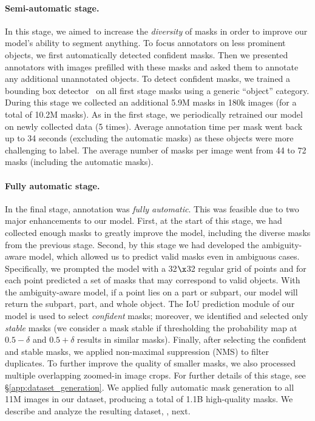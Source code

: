 \paragraph{Semi-automatic stage.} In this stage, we aimed to increase the \emph{diversity} of masks in order to improve our model's ability to segment anything. To focus annotators on less prominent objects, we first automatically detected confident masks. Then we presented annotators with images prefilled with these masks and asked them to annotate any additional unannotated objects. To detect confident masks, we trained a bounding box detector~\cite{Ren2015} on all first stage masks using a generic ``object'' category. During this stage we collected an additional 5.9M masks in 180k images (for a total of 10.2M masks). As in the first stage, we periodically retrained our model on newly collected data (5 times). Average annotation time per mask went back up to 34 seconds (excluding the automatic masks) as these objects were more challenging to label. The average number of masks per image went from 44 to 72 masks (including the automatic masks).

\paragraph{Fully automatic stage.} In the final stage, annotation was \emph{fully automatic}. This was feasible due to two major enhancements to our model. First, at the start of this stage, we had collected enough masks to greatly improve the model, including the diverse masks from the previous stage. Second, by this stage we had developed the ambiguity-aware model, which allowed us to predict valid masks even in ambiguous cases. Specifically, we prompted the model with a 32$\x$32 regular grid of points and for each point predicted a set of masks that may correspond to valid objects. With the ambiguity-aware model, if a point lies on a part or subpart, our model will return the subpart, part, and whole object. The IoU prediction module of our model is used to select \emph{confident} masks; moreover, we identified and selected only \emph{stable} masks (we consider a mask stable if thresholding the probability map at $0.5-\delta$ and $0.5+\delta$ results in similar masks). Finally, after selecting the confident and stable masks, we applied non-maximal suppression (NMS) to filter duplicates. To further improve the quality of smaller masks, we also processed multiple overlapping zoomed-in image crops. For further details of this stage, see \S\ref{app:dataset_generation}. We applied fully automatic mask generation to all 11M images in our dataset, producing a total of 1.1B high-quality masks. We describe and analyze the resulting dataset, \sad, next.

